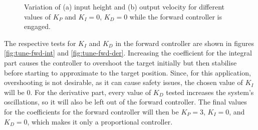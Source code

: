 \begin{figure}
  \centering
  \caption{Variation of (a) input height and (b) output velocity for different values of $K_{P}$ and $K_I=0$, $K_D=0$ while the forward controller is engaged.}\label{fig:tune-fwd-prop}
\end{figure}


The respective tests for $K_I$ and $K_D$ in the forward controller are shown in figures \ref{fig:tune-fwd-int} and \ref{fig:tune-fwd-der}.
Increasing the coefficient for the integral part causes the controller to overshoot the target initially but then stabilise before starting to approximate to the target position.
Since, for this application, overshooting is not desirable, as it can cause safety issues, the chosen value of $K_I$ will be 0.
For the derivative part, every value of $K_D$ tested increases the system's oscillations, so it will also be left out of the forward controller.
The final values for the coefficients for the forward controller will then be $K_P=3$, $K_I=0$, and $K_D=0$, which makes it only a proportional controller.



